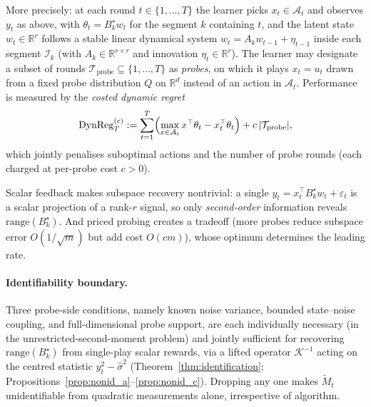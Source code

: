 \documentclass{article}
\newcommand{\R}{\mathbb{R}}
\newcommand{\cA}{\mathcal{A}}
\newcommand{\cI}{\mathcal{I}}
\newcommand{\cTprobe}{\mathcal{T}_{\mathrm{probe}}}
\newcommand{\DynReg}{\mathrm{DynReg}}
\newcommand{\range}{\mathrm{range}}
\begin{document}
More precisely: at each round $t\in\{1,\dots,T\}$ the learner picks
$x_t\in\cA_t$ and observes $y_t$ as above, with
$\theta_t=B_k^\star w_t$ for the segment $k$ containing $t$, and the
latent state $w_t\in\R^r$ follows a stable linear dynamical system
$w_t=A_k w_{t-1}+\eta_{t-1}$ inside each segment $\cI_k$
(with $A_k\in\R^{r\times r}$ and innovation $\eta_t\in\R^r$). The
learner may designate a subset of rounds $\cTprobe\subseteq\{1,\dots,T\}$
as \emph{probes}, on which it plays $x_t=u_t$ drawn from a fixed probe
distribution $Q$ on $\R^d$ instead of an action in $\cA_t$. Performance
is measured by the \emph{costed dynamic regret}
\begin{equation}
\DynReg_T^{(c)} := \sum_{t=1}^T \Bigl(\max_{x\in\cA_t} x^\top \theta_t
  - x_t^\top \theta_t\Bigr) + c\,|\cTprobe|,
\label{eq:intro_costed_regret}
\end{equation}
which jointly penalises suboptimal actions and the number of probe
rounds (each charged at per-probe cost $c>0$).

Scalar feedback makes subspace recovery nontrivial: a single
$y_t = x_t^\top B_k^\star w_t + \varepsilon_t$ is a scalar projection
of a rank-$r$ signal, so only \emph{second-order} information reveals
$\range(B_k^\star)$. And priced probing creates a
tradeoff (more probes reduce subspace error $O(1/\sqrt{m})$ but add
cost $O(cm)$), whose optimum determines the leading rate.

\paragraph{Identifiability boundary.}
  Three probe-side conditions, namely known noise variance, bounded
  state--noise coupling, and full-dimensional probe support, are each
  individually necessary (in the unrestricted-second-moment problem)
  and jointly sufficient for recovering $\range(B_k^\star)$ from
  single-play scalar rewards, via a lifted operator $\mathcal K^{-1}$
  acting on the centred statistic $y_t^2-\widehat\sigma^2$
  (Theorem~\ref{thm:identification};
  Propositions~\ref{prop:nonid_a}--\ref{prop:nonid_c}). Dropping any
  one makes $\widetilde M_t$ unidentifiable from quadratic
  measurements alone, irrespective of algorithm.
\end{document}
